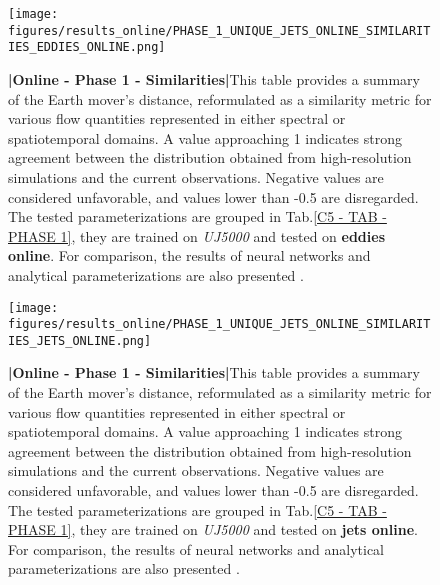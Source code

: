%
%
\newpage

\begin{figure}[H]
    \centering
    \texttt{[image: figures/results\_online/PHASE\_1\_UNIQUE\_JETS\_ONLINE\_SIMILARITIES\_EDDIES\_ONLINE.png]}
    \caption{\textbf{|}\textcolor{section_color}{\textbf{Online - Phase 1 - Similarities}}\textbf{|}This table provides a summary of the Earth mover's distance, reformulated as a similarity metric for various flow quantities represented in either spectral or spatiotemporal domains. A value approaching 1 indicates strong agreement between the distribution obtained from high-resolution simulations and the current observations. Negative values are considered unfavorable, and values lower than -0.5 are disregarded. The tested parameterizations are grouped in Tab.\ref{C5 - TAB - PHASE 1}, they are trained on \textit{UJ5000} and tested on \textbf{eddies online}. For comparison, the results of neural networks \citep{Benchmarking} and analytical parameterizations are also presented \citep{ClosureAnalytical2, ClosureAnalytical51, ClosureDataDrivenZanna}.}
    \label{APP - ONLINE - PHASE 1 - SIMILARITIES -  JETS UNIQUE 5000 and EDDIES ONLINE}
\end{figure}

\newpage

\begin{figure}[H]
    \centering
    \texttt{[image: figures/results\_online/PHASE\_1\_UNIQUE\_JETS\_ONLINE\_SIMILARITIES\_JETS\_ONLINE.png]}
    \caption{\textbf{|}\textcolor{section_color}{\textbf{Online - Phase 1 - Similarities}}\textbf{|}This table provides a summary of the Earth mover's distance, reformulated as a similarity metric for various flow quantities represented in either spectral or spatiotemporal domains. A value approaching 1 indicates strong agreement between the distribution obtained from high-resolution simulations and the current observations. Negative values are considered unfavorable, and values lower than -0.5 are disregarded. The tested parameterizations are grouped in Tab.\ref{C5 - TAB - PHASE 1}, they are trained on \textit{UJ5000} and tested on \textbf{jets online}. For comparison, the results of neural networks \citep{Benchmarking} and analytical parameterizations are also presented \citep{ClosureAnalytical2, ClosureAnalytical51, ClosureDataDrivenZanna}.}
    \label{APP - ONLINE - PHASE 1 - SIMILARITIES -  JETS UNIQUE 5000 and JETS ONLINE}
\end{figure}

